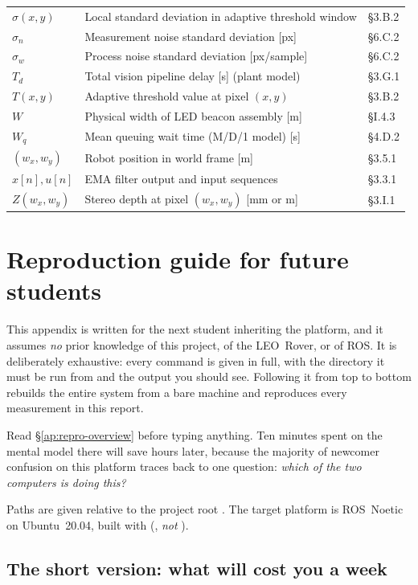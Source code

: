 \begin{longtable}{@{}L{2.6cm}L{7.6cm}L{2.2cm}@{}}
$\sigma(x,y)$ & Local standard deviation in adaptive threshold window & \S3.B.2 \\
$\sigma_n$ & Measurement noise standard deviation [px] & \S6.C.2 \\
$\sigma_w$ & Process noise standard deviation [px/sample] & \S6.C.2 \\
$T_d$ & Total vision pipeline delay [s] (plant model) & \S 3.G.1 \\
$T(x,y)$ & Adaptive threshold value at pixel $(x,y)$ & \S3.B.2 \\
$W$ & Physical width of LED beacon assembly [m] & \S I.4.3 \\
$W_q$ & Mean queuing wait time (M/D/1 model) [s] & \S4.D.2 \\
$(w_x, w_y)$ & Robot position in world frame [m] & \S3.5.1 \\
$x[n], u[n]$ & EMA filter output and input sequences & \S3.3.1 \\
$Z(w_x, w_y)$ & Stereo depth at pixel $(w_x,w_y)$ [mm or m] & \S3.I.1 \\
\bottomrule
\end{longtable}
\endgroup

\chapter{Reproduction guide for future students}
\label{ap:repro}

This appendix is written for the next student inheriting the platform, and it
assumes \emph{no} prior knowledge of this project, of the LEO~Rover, or of
ROS. It is deliberately exhaustive: every command is given in full, with the
directory it must be run from and the output you should see. Following it from
top to bottom rebuilds the entire system from a bare machine and reproduces
every measurement in this report.

Read \S\ref{ap:repro-overview} before typing anything. Ten minutes spent on
the mental model there will save hours later, because the majority of
newcomer confusion on this platform traces back to one question: \emph{which
of the two computers is doing this?}

Paths are given relative to the project root .
The target platform is ROS~Noetic on Ubuntu~20.04, built with
 (, \emph{not} ).

\section*{The short version: what will cost you a week}

